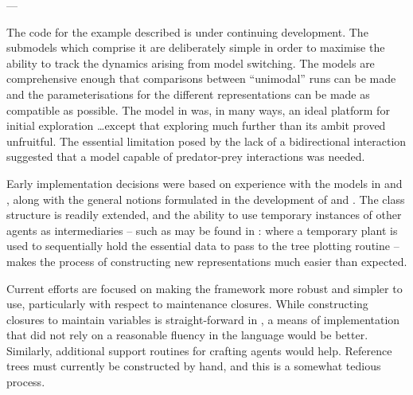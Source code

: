\begin{center}
---
\end{center}

The code for the example described is under continuing
development. The submodels which comprise it are deliberately simple
in order to maximise the ability to track the dynamics arising from
model switching.  The models are comprehensive enough that comparisons
between ``unimodal'' runs can be made and the parameterisations for
the different representations can be made as compatible as possible.
The model in \Ctwo was, in many ways, an ideal platform for initial
exploration \ldots except that exploring much further than its ambit
proved unfruitful.  The essential limitation posed by the lack of a
bidirectional interaction suggested that a model capable of
predator-prey interactions was needed.

Early implementation decisions were based on experience with the
models in \cite{lyne1994pmez5,gray2006nws} and \cite{grayningaloo},
along with the general notions formulated in the development
of \Ctwo and \Cthree. The class structure is readily extended, and the
ability to use temporary instances of other agents as intermediaries
-- such as may be found in : where
a temporary plant is used to sequentially hold the essential data to
pass to the tree plotting routine -- makes the process of constructing
new representations much easier than expected.

Current efforts are focused on making the framework more robust and
simpler to use, particularly with respect to maintenance
closures. While constructing closures to maintain variables is
straight-forward in \Scheme, a means of implementation that did not
rely on a reasonable fluency in the language would be better.
Similarly, additional support routines for crafting 
agents would help. Reference trees must currently be constructed by
hand, and this is a somewhat tedious process.
\pagebreak
